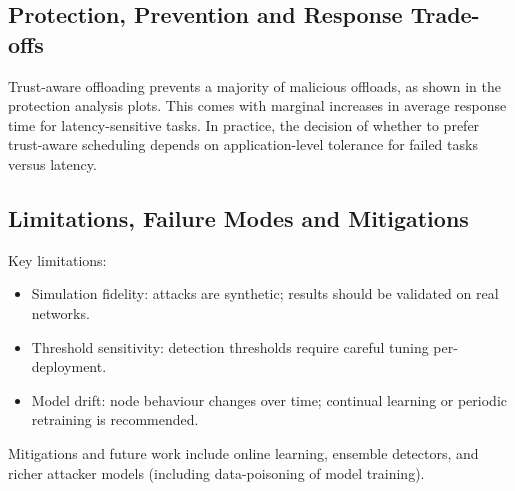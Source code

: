 \documentclass[12pt,a4paper]{article}
\begin{document}
\subsection{Protection, Prevention and Response Trade-offs}
Trust-aware offloading prevents a majority of malicious offloads, as shown in the protection analysis plots. This comes with marginal increases in average response time for latency-sensitive tasks. In practice, the decision of whether to prefer trust-aware scheduling depends on application-level tolerance for failed tasks versus latency.

\subsection{Limitations, Failure Modes and Mitigations}
Key limitations:
\begin{itemize}
  \item Simulation fidelity: attacks are synthetic; results should be validated on real networks.
  \item Threshold sensitivity: detection thresholds require careful tuning per-deployment.
  \item Model drift: node behaviour changes over time; continual learning or periodic retraining is recommended.
\end{itemize}

Mitigations and future work include online learning, ensemble detectors, and richer attacker models (including data-poisoning of model training).
\end{document}
